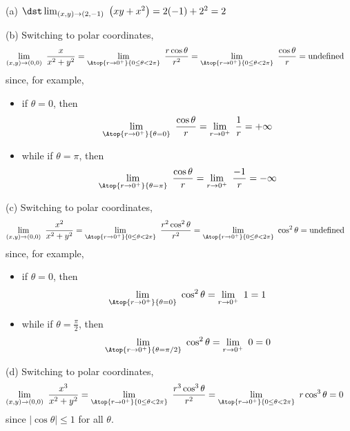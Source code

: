 \begin{solution}
(a) $\dst\lim_{(x,y)\rightarrow(2,-1)}\ \big(xy+x^2\big)=2(-1)+2^2=2$

(b) Switching to polar coordinates,
\begin{align*}
\lim_{(x,y)\rightarrow(0,0)}\ \frac{x}{x^2+y^2}
    &=\lim_{\Atop{r\rightarrow0^+}{0\le\theta<2\pi}}\ \frac{r\cos\theta}{r^2}
     =\lim_{\Atop{r\rightarrow0^+}{0\le\theta<2\pi}}\ \frac{\cos\theta}{r} 
    =\text{undefined}
\end{align*}
since, for example,
\begin{itemize}
\item 
if $\theta=0$, then 
\begin{equation*}
\lim_{\Atop{r\rightarrow0^+}{\theta=0}}\ \frac{\cos\theta}{r}
=\lim_{r\rightarrow0^+}\ \frac{1}{r}
=+\infty
\end{equation*}
\item
while if $\theta=\pi$, then 
\begin{equation*}
\lim_{\Atop{r\rightarrow0^+}{\theta=\pi}}\ \frac{\cos\theta}{r}
=\lim_{r\rightarrow0^+}\ \frac{-1}{r}
=-\infty
\end{equation*}
\end{itemize}

(c) Switching to polar coordinates,
\begin{align*}
\lim_{(x,y)\rightarrow(0,0)}\ \frac{x^2}{x^2+y^2}
  &=\lim_{\Atop{r\rightarrow0^+}{0\le\theta<2\pi}}\ \frac{r^2\cos^2\theta}{r^2}
     =\lim_{\Atop{r\rightarrow0^+}{0\le\theta<2\pi}}\ \cos^2\theta 
    =\text{undefined}
\end{align*}
since, for example,
\begin{itemize}
\item 
if $\theta=0$, then 
\begin{equation*}
\lim_{\Atop{r\rightarrow0^+}{\theta=0}}\ \cos^2\theta
=\lim_{r\rightarrow0^+}\ 1
= 1
\end{equation*}
\item
while if $\theta=\frac{\pi}{2}$, then 
\begin{equation*}
\lim_{\Atop{r\rightarrow0^+}{\theta=\pi/2}}\ \cos^2\theta
=\lim_{r\rightarrow0^+}\ 0
=0
\end{equation*}
\end{itemize}

(d) Switching to polar coordinates,
\begin{align*}
\lim_{(x,y)\rightarrow(0,0)}\ \frac{x^3}{x^2+y^2}
   &=\lim_{\Atop{r\rightarrow0^+}{0\le\theta<2\pi}}\ \frac{r^3\cos^3\theta}{r^2}
     =\lim_{\Atop{r\rightarrow0^+}{0\le\theta<2\pi}}\ r\cos^3\theta 
    =0
\end{align*}
since $|\cos\theta|\le 1$ for all $\theta$.


\end{solution}
